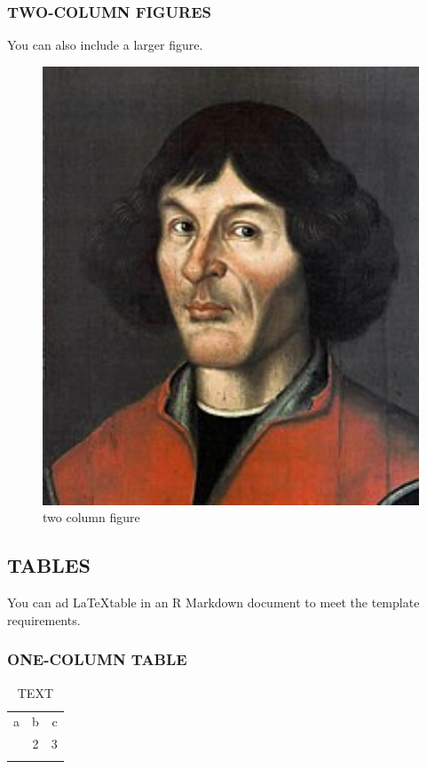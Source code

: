 \documentclass[gc, manuscript]{copernicus}
\begin{document}
\subsubsection{TWO-COLUMN FIGURES}

You can also include a larger figure.

\begin{figure}
\includegraphics[width=12cm]{Nikolaus_Kopernikus} \caption{two column figure}\label{fig:unnamed-chunk-3}
\end{figure}

\subsection{TABLES}

You can ad \LaTeX table in an R Markdown document to meet the template
requirements.

\subsubsection{ONE-COLUMN TABLE}

\begin{table}[t]
\caption{TEXT}
\begin{tabular}{l c r}
\tophline

a & b & c \\
\middlehline
1 & 2 & 3 \\

\bottomhline
\end{tabular}
\end{table}
\end{document}
